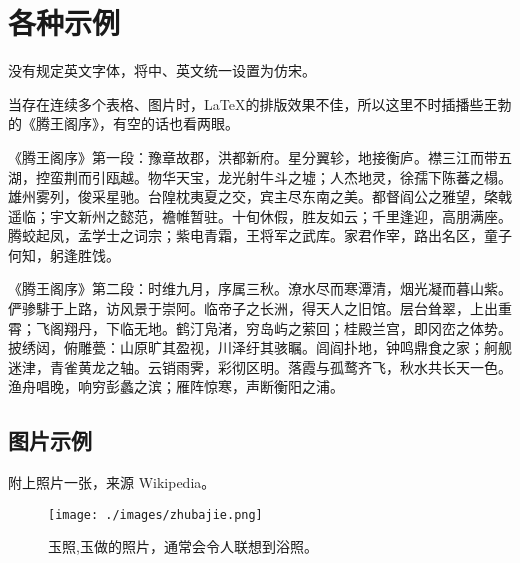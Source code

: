 
\section{各种示例}

没有规定英文字体，将中、英文统一设置为仿宋。

当存在连续多个表格、图片时，\LaTeX 的排版效果不佳，所以这里不时插播些王勃的《腾王阁序》，有空的话也看两眼。

《腾王阁序》第一段：豫章故郡，洪都新府。星分翼轸，地接衡庐。襟三江而带五湖，控蛮荆而引瓯越。物华天宝，龙光射牛斗之墟；人杰地灵，徐孺下陈蕃之榻。雄州雾列，俊采星驰。台隍枕夷夏之交，宾主尽东南之美。都督阎公之雅望，棨戟遥临；宇文新州之懿范，襜帷暂驻。十旬休假，胜友如云；千里逢迎，高朋满座。腾蛟起凤，孟学士之词宗；紫电青霜，王将军之武库。家君作宰，路出名区，童子何知，躬逢胜饯。

《腾王阁序》第二段：时维九月，序属三秋。潦水尽而寒潭清，烟光凝而暮山紫。俨骖騑于上路，访风景于崇阿。临帝子之长洲，得天人之旧馆。层台耸翠，上出重霄；飞阁翔丹，下临无地。鹤汀凫渚，穷岛屿之萦回；桂殿兰宫，即冈峦之体势。披绣闼，俯雕甍：山原旷其盈视，川泽纡其骇瞩。闾阎扑地，钟鸣鼎食之家；舸舰迷津，青雀黄龙之轴。云销雨霁，彩彻区明。落霞与孤鹜齐飞，秋水共长天一色。渔舟唱晚，响穷彭蠡之滨；雁阵惊寒，声断衡阳之浦。

\subsection{图片示例}

附上照片一张，来源 Wikipedia。

\begin{figure}[htbp]
  \centering
  \texttt{[image: ./images/zhubajie.png]}
  \caption{玉照,玉做的照片，通常会令人联想到浴照。}
  \label{fig:example}
\end{figure}

